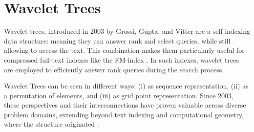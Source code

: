 \clearpage
\section{Wavelet Trees}
\noindent Wavelet trees, introduced in 2003 by Grossi, Gupta, and Vitter \cite{GrossiWT2003,} are a self indexing data structure: meaning they can answer rank and select queries, while still allowing to access the text. This combination makes them particularly useful for compressed full-text indexes like the FM-index \cite{ferragina2000opportunistic}. In such indexes, wavelet trees are employed to efficiently answer rank queries during the search process. \vspace{0.4cm}


 \vspace{0.4cm}

\noindent Wavelet Trees can be seen in different ways: (i) as sequence representation, (ii) as a permutation of elements, and (iii) as grid point representation. Since 2003, these perspectives and their interconnections have proven valuable across diverse problem domains, extending beyond text indexing and computational geometry, where the structure originated \cite{WTForALL,WTFromTheoryToPractice,TheMyriadVirtuesWT}.

